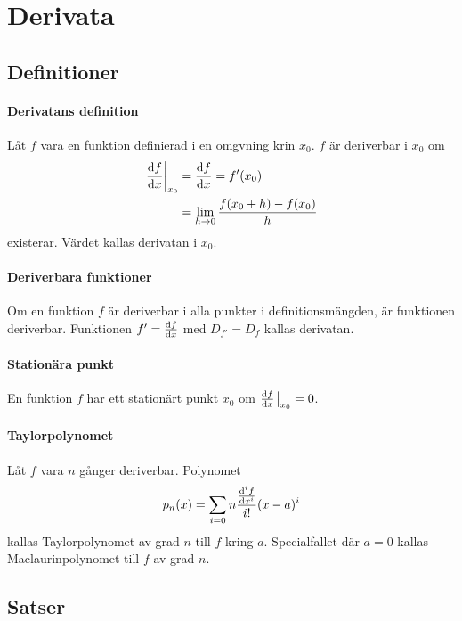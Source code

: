 \section{Derivata}

\subsection{Definitioner}

\paragraph{Derivatans definition}
Låt $f$ vara en funktion definierad i en omgvning krin $x_0$. $f$ är deriverbar i $x_0$ om
\begin{align*}
	\eval{\dv{f}{x}}_{x_0} &= \dv{f}{x} (x_0) = f'(x_0) \\
	                           &= \lim\limits_{h\to 0}\frac{f(x_0 + h) - f(x_0)}{h}
\end{align*}
existerar. Värdet kallas derivatan i $x_0$.

\paragraph{Deriverbara funktioner}
Om en funktion $f$ är deriverbar i alla punkter i definitionsmängden, är funktionen deriverbar. Funktionen $f' = \dv{f}{x}$ med $D_{f'} = D_f$ kallas derivatan.

\paragraph{Stationära punkt}
En funktion $f$ har ett stationärt punkt $x_0$ om $\dv{f}{x}\eval_{x_0} = 0$.

\paragraph{Taylorpolynomet}
Låt $f$ vara $n$ gånger deriverbar. Polynomet
\begin{align*}
	p_n(x) = \sum\limits_{i = 0}{n}\frac{\dv[i]{f}{x} (0)}{i!}(x - a)^i
\end{align*}
kallas Taylorpolynomet av grad $n$ till $f$ kring $a$. Specialfallet där $a = 0$ kallas Maclaurinpolynomet till $f$ av grad $n$.

\subsection{Satser}

